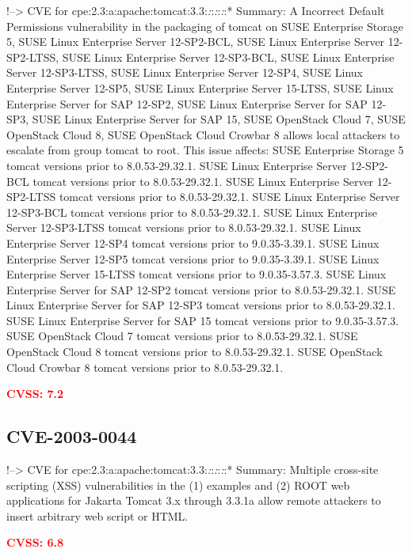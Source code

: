 \documentclass[a4paper, 12pt]{article}
\begin{document}
!--\textgreater{} CVE for
cpe:2.3:a:apache:tomcat:3.3:\emph{:}:\emph{:}:\emph{:}:* Summary: A
Incorrect Default Permissions vulnerability in the packaging of tomcat
on SUSE Enterprise Storage 5, SUSE Linux Enterprise Server 12-SP2-BCL,
SUSE Linux Enterprise Server 12-SP2-LTSS, SUSE Linux Enterprise Server
12-SP3-BCL, SUSE Linux Enterprise Server 12-SP3-LTSS, SUSE Linux
Enterprise Server 12-SP4, SUSE Linux Enterprise Server 12-SP5, SUSE
Linux Enterprise Server 15-LTSS, SUSE Linux Enterprise Server for SAP
12-SP2, SUSE Linux Enterprise Server for SAP 12-SP3, SUSE Linux
Enterprise Server for SAP 15, SUSE OpenStack Cloud 7, SUSE OpenStack
Cloud 8, SUSE OpenStack Cloud Crowbar 8 allows local attackers to
escalate from group tomcat to root. This issue affects: SUSE Enterprise
Storage 5 tomcat versions prior to 8.0.53-29.32.1. SUSE Linux Enterprise
Server 12-SP2-BCL tomcat versions prior to 8.0.53-29.32.1. SUSE Linux
Enterprise Server 12-SP2-LTSS tomcat versions prior to 8.0.53-29.32.1.
SUSE Linux Enterprise Server 12-SP3-BCL tomcat versions prior to
8.0.53-29.32.1. SUSE Linux Enterprise Server 12-SP3-LTSS tomcat versions
prior to 8.0.53-29.32.1. SUSE Linux Enterprise Server 12-SP4 tomcat
versions prior to 9.0.35-3.39.1. SUSE Linux Enterprise Server 12-SP5
tomcat versions prior to 9.0.35-3.39.1. SUSE Linux Enterprise Server
15-LTSS tomcat versions prior to 9.0.35-3.57.3. SUSE Linux Enterprise
Server for SAP 12-SP2 tomcat versions prior to 8.0.53-29.32.1. SUSE
Linux Enterprise Server for SAP 12-SP3 tomcat versions prior to
8.0.53-29.32.1. SUSE Linux Enterprise Server for SAP 15 tomcat versions
prior to 9.0.35-3.57.3. SUSE OpenStack Cloud 7 tomcat versions prior to
8.0.53-29.32.1. SUSE OpenStack Cloud 8 tomcat versions prior to
8.0.53-29.32.1. SUSE OpenStack Cloud Crowbar 8 tomcat versions prior to
8.0.53-29.32.1.

\textbf{\textcolor{red}{CVSS: 7.2}}

\hypertarget{cve-2003-0044}{%
\subsection{CVE-2003-0044}\label{cve-2003-0044}}

!--\textgreater{} CVE for
cpe:2.3:a:apache:tomcat:3.3:\emph{:}:\emph{:}:\emph{:}:* Summary:
Multiple cross-site scripting (XSS) vulnerabilities in the (1) examples
and (2) ROOT web applications for Jakarta Tomcat 3.x through 3.3.1a
allow remote attackers to insert arbitrary web script or HTML.

\textbf{\textcolor{red}{CVSS: 6.8}}
\end{document}

